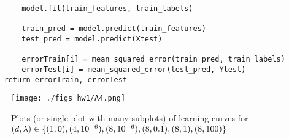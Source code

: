 \documentclass{article}
\begin{document}
\begin{aprob}
\begin{lstlisting}
        model.fit(train_features, train_labels)

        train_pred = model.predict(train_features)
        test_pred = model.predict(Xtest)

        errorTrain[i] = mean_squared_error(train_pred, train_labels)
        errorTest[i] = mean_squared_error(test_pred, Ytest)    
    return errorTrain, errorTest
    \end{lstlisting}

    \begin{figure}[htp] 
    \centering
    \vspace*{-0.1in}
    \texttt{[image: ./figs\_hw1/A4.png]}
    \caption{Plots (or single plot with many subplots) of learning curves for $(d, \lambda) \in \{(1, 0), (4, 10^{-6}), (8, 10^{-6}), \\ (8, 0.1), (8, 1), (8, 100)\}$}
    \label{figs:A3b.png}
    \end{figure}
    
\end{aprob}

\clearpage{}
\end{document}

